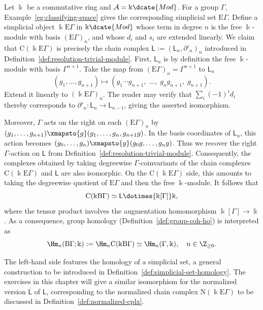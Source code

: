\begin{example}\label{eg:classifying-space-std-cplx}
	Let $\Bbbk$ be a commutative ring and
	$\mathcal{A}=\Bbbk\dcate{Mod}$. For a group $\Gamma$,
	Example~\ref{eg:classifying-space} gives the corresponding simplicial set
	$\mathrm{E}\Gamma$. Define a simplicial object
	$\Bbbk\mathrm{E}\Gamma$ in $\Bbbk\dcate{Mod}$ whose term in degree $n$
	is the free $\Bbbk$-module with basis $(\mathrm{E}\Gamma)_n$, and whose
	$d_i$ and $s_i$ are extended linearly. We claim that
	$\mathrm{C}(\Bbbk\mathrm{E}\Gamma)$ is precisely the chain complex
	$\mathsf{L}:=(\mathsf{L}_n,\partial'_n)_n$ introduced in
	Definition~\ref{def:resolution-trivial-module}. First,
	$\mathsf{L}_n$ is by definition the free $\Bbbk$-module with basis
	$\Gamma^{n+1}$. Take the map from
	$(\mathrm{E}\Gamma)_n=\Gamma^{n+1}$ to $\mathsf{L}_n$
	\[ \left( g_1, \ldots, g_{n+1} \right) \mapsto \left(g_1 \cdots g_{n+1}, \; \ldots , \; g_n g_{n+1}, \; g_{n+1}\right). \]
	Extend it linearly to $(\Bbbk\mathrm{E}\Gamma)_n$. The reader may verify
	that $\sum_i(-1)^id_i$ thereby corresponds to
	$\partial'_n:\mathsf{L}_n\to\mathsf{L}_{n-1}$, giving the asserted
	isomorphism.

	Moreover, $\Gamma$ acts on the right on each $(\mathrm{E}\Gamma)_n$ by
	$(g_1,\ldots,g_{n+1})\xmapsto{g}(g_1,\ldots,g_n,g_{n+1}g)$. In the basis
	coordinates of $\mathsf{L}_n$, this action becomes
	$(g_0,\ldots,g_n)\xmapsto{g}(g_0g,\ldots,g_ng)$. Thus we recover the
	right $\Gamma$-action on $\mathsf{L}$ from
	Definition~\ref{def:resolution-trivial-module}. Consequently, the
	complexes obtained by taking degreewise $\Gamma$-coinvariants of the
	chain complexes $\mathrm{C}(\Bbbk\mathrm{E}\Gamma)$ and $\mathsf{L}$
	are also isomorphic. On the $\mathrm{C}(\Bbbk\mathrm{E}\Gamma)$ side,
	this amounts to taking the degreewise quotient of $\mathrm{E}\Gamma$ and
	then the free $\Bbbk$-module. It follows that
	\[ \mathrm{C}(\Bbbk\mathrm{B}\Gamma) \simeq \mathsf{L} \dotimes{\Bbbk[\Gamma]} \Bbbk, \]
	where the tensor product involves the augmentation homomorphism
	$\Bbbk[\Gamma]\to\Bbbk$. As a consequence, group homology
	(Definition~\ref{def:group-coh-ho}) is interpreted as
	\[ \Hm_n(\mathrm{B}\Gamma; \Bbbk) := \Hm_n \mathrm{C}(\Bbbk\mathrm{B}\Gamma) \simeq \Hm_n(\Gamma, \Bbbk), \quad n \in \Z_{\geq 0}. \]

	The left-hand side features the homology of a simplicial set, a general
	construction to be introduced in
	Definition~\ref{def:simplicial-set-homology}. The exercises in this
	chapter will give a similar isomorphism for the normalized version
	$\overline{\mathsf{L}}$ of $\mathsf{L}$, corresponding to the normalized
	chain complex $\mathrm{N}(\Bbbk\mathrm{E}\Gamma)$ to be discussed in
	Definition~\ref{def:normalized-cplx}.
\end{example}

